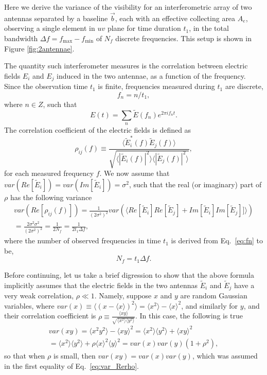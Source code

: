 \documentclass[12pt]{paper}
\newcommand{\beq}{\begin{equation}}
\newcommand{\eeq}{\end{equation}}
\newcommand{\bga}{\begin{gathered}}
\newcommand{\ega}{\end{gathered}}
\begin{document}
Here we derive the variance of the visibility for an interferometric array of two antennas separated by a baseline $\vec{b}$, each with an effective collecting area $A_e$, observing a single element in $uv$ plane for time duration $t_1$, in the total bandwidth $\Delta f = f_\text{max}-f_\text{min}$ of $N_f$ discrete frequencies. This setup is shown in Figure \ref{fig:2antennae}.

The quantity such interferometer measures is the correlation between electric fields $E_i$ and $E_j$ induced in the two antennae, as a function of the frequency. Since the observation time $t_1$ is finite, frequencies measured during $t_1$ are discrete, 
\beq
f_n = n/t_1, 
\label{eq:fn}
\eeq
where $n\in Z$, such that
\beq
E(t) = \sum_{n}\widetilde{E}(f_n)e^{2\pi if_nt}.
\eeq
The correlation coefficient of the electric fields is defined as
\beq
\rho_{ij}(f) \equiv \frac{\langle \widetilde{E}^*_i(f)\widetilde E_j(f)\rangle}{\sqrt{\langle |\widetilde{E}_i(f)|^2\rangle\langle|\widetilde E_j(f)|^2\rangle}},
\label{eq:rho_ij}
\eeq
for each measured frequency $f$. We now assume that $var(Re[ \widetilde E_i])=var(Im[\widetilde E_i])=\sigma^2$, such that the real (or imaginary) part of $\rho$ has the following variance
\beq
\bga
var(Re[\rho_{ij}(f)]) = \frac{1}{(2\sigma^2)^2}var(\langle Re[\widetilde{E}_i]Re[\widetilde{E}_j] + Im[\widetilde{E}_i]Im[\widetilde{E}_j]]\rangle) \\
= \frac{2\sigma^2\sigma^2}{(2\sigma^2)^2} = \frac{1}{2N_f} = \frac{1}{2t_1\Delta f},
\ega
\label{eq:var_Rerho}
\eeq
where the number of observed frequencies in time $t_1$ is derived from Eq.~\ref{eq:fn} to be,
\beq
N_f =  t_1\Delta f.
\label{eq:Nf}
\eeq

Before continuing, let us take a brief digression to show that the above formula implicitly assumes that the electric fields in the two antennas $\widetilde E_i$ and $\widetilde E_j$ have a very weak correlation, $\rho\ll 1$. Namely, suppose $x$ and $y$ are random Gaussian variables, where $var(x)\equiv\langle(x-\langle x\rangle)^2\rangle = \langle x^2\rangle - \langle x \rangle^2$, and similarly for $y$, and their correlation coefficient is $\rho\equiv \frac{\langle xy\rangle}{\sqrt{\langle x^2\rangle \langle y^2\rangle}}$. In this case, the following is true
\beq
\bga
var(xy) = \langle x^2y^2\rangle -  \langle xy \rangle^2 = 
\langle x^2\rangle \langle y^2\rangle + \langle xy\rangle^2\\
=\langle x^2\rangle \langle y^2\rangle+\rho \langle x\rangle^2\langle y\rangle^2=var(x)var(y)(1+\rho^2),
\ega
\eeq
so that when $\rho$ is small, then $var(xy)=var(x)var(y)$, which was assumed in the first equality of Eq.~\ref{eq:var_Rerho}.
\end{document}
